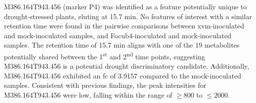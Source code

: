 M386.164T943.456 (marker P4) was identified as a feature potentially unique to drought-stressed plants, eluting at 15.7 min. No features of interest with a similar retention time were found in the pairwise comparisons between \ac{xvm}-inoculated and mock-inoculated samples, and \ac{Focub4}-inoculated and mock-inoculated samples. The retention time of 15.7 min aligns with one of the 19 metabolites potentially shared between the 1\textsuperscript{st} and 2\textsuperscript{nd} time points, suggesting M386.164T943.456 is a potential drought discriminatory candidate. Additionally, M386.164T943.456 exhibited an \ac{fc} of 3.9157 compared to the mock-inoculated samples. Consistent with previous findings, the peak intensities for M386.164T943.456 were low, falling within the range of $\geq800$ to $\leq2000$. 





